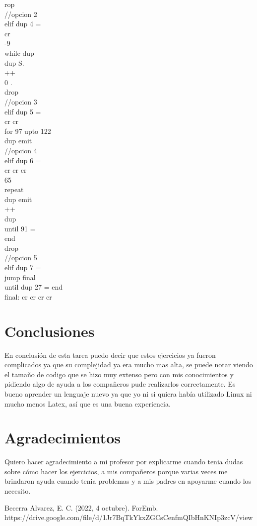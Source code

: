 \documentclass[conference]{IEEEtran}
\begin{document}
\begin{enumerate}
\begin{center}
rop \\ //opcion 2 \\ elif dup 4 = \\ cr \\ -9 \\ while dup \\  dup S. \\ ++ \\ 0 . \\ drop \\ //opcion 3 \\ elif dup 5 = \\ cr cr \\ for 97 upto 122 \\ dup emit \\ //opcion 4 \\ elif dup 6 = \\ cr cr cr \\ 65 \\ repeat \\ dup emit \\ ++ \\ dup \\ until 91 = \\  end \\ drop \\ //opcion 5 \\ elif dup 7 = \\ jump final \\ until dup 27 = end \\ final: cr cr cr cr 
	\end{center}

\end{enumerate}

\section{Conclusiones}  
En conclusión de esta tarea puedo decir que estos ejercicios ya fueron complicados ya que su complejidad ya era mucho mas alta, se puede notar viendo el tamaño de codigo que se hizo muy extenso pero con mis conocimientos y pidiendo algo de ayuda a los compañeros pude realizarlos correctamente. Es bueno aprender un lenguaje nuevo ya que yo ni si quiera había utilizado Linux ni mucho menos Latex, así que es una buena experiencia.

\section*{Agradecimientos}
Quiero hacer agradecimiento a mi profesor por explicarme cuando tenia dudas sobre cómo hacer los ejercicios, a mis compañeros porque varias veces me brindaron ayuda cuando tenia problemas y a mis padres en apoyarme cuando los necesito.

\begin{thebibliography}{00}
 Becerra Alvarez, E. C. (2022, 4 octubre). ForEmb. https://drive.google.com/file/d/1Jr7BqTkYkxZGCsCenfmQIbHnKNIp3zcV/view
\end{thebibliography}
\end{document}
